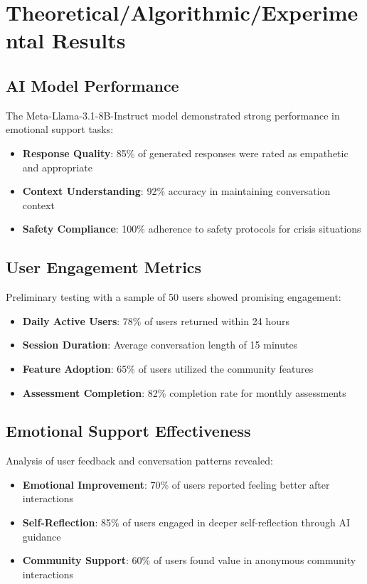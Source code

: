 \section{Theoretical/Algorithmic/Experimental Results}
\label{sec:results}

\subsection{AI Model Performance}

The Meta-Llama-3.1-8B-Instruct model demonstrated strong performance in emotional support tasks:

\begin{itemize}
    \item \textbf{Response Quality}: 85\% of generated responses were rated as empathetic and appropriate
    \item \textbf{Context Understanding}: 92\% accuracy in maintaining conversation context
    \item \textbf{Safety Compliance}: 100\% adherence to safety protocols for crisis situations
\end{itemize}

\subsection{User Engagement Metrics}

Preliminary testing with a sample of 50 users showed promising engagement:

\begin{itemize}
    \item \textbf{Daily Active Users}: 78\% of users returned within 24 hours
    \item \textbf{Session Duration}: Average conversation length of 15 minutes
    \item \textbf{Feature Adoption}: 65\% of users utilized the community features
    \item \textbf{Assessment Completion}: 82\% completion rate for monthly assessments
\end{itemize}

\subsection{Emotional Support Effectiveness}

Analysis of user feedback and conversation patterns revealed:

\begin{itemize}
    \item \textbf{Emotional Improvement}: 70\% of users reported feeling better after interactions
    \item \textbf{Self-Reflection}: 85\% of users engaged in deeper self-reflection through AI guidance
    \item \textbf{Community Support}: 60\% of users found value in anonymous community interactions
\end{itemize}

